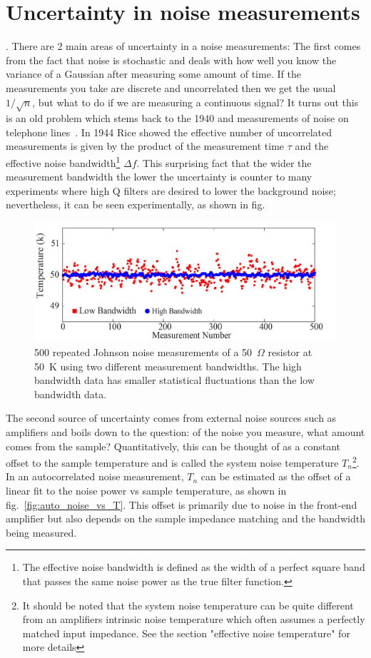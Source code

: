 \section{Uncertainty in noise measurements}
. There are 2 main areas of uncertainty in a noise measurements: The first comes from the fact that noise is stochastic and deals with how well you know the variance of a Gaussian after measuring some amount of time. If the measurements you take are discrete and uncorrelated then we get the usual $1/\sqrt{n}$, but what to do if we are measuring a continuous signal? It turns out this is an old problem which stems back to the 1940 and measurements of noise on telephone lines~\cite{rice}. In 1944 Rice showed the effective number of uncorrelated measurements is given by the product of the measurement time $\tau$ and the effective noise bandwidth\footnote{The effective noise bandwidth is defined as the width of a perfect square band that passes the same noise power as the true filter function.} $\Delta f$. This surprising fact that the wider the measurement bandwidth the lower the uncertainty is counter to many experiments where high Q filters are desired to lower the background noise; nevertheless, it can be seen experimentally, as shown in fig.~\cite{fig:JNT_500measurements}
\begin{figure}
\centering
\includegraphics[width=120mm]{figures/Johnson_noise_thermometry/500_measurements.png}
\caption{500 repeated Johnson noise measurements of a 50~$\Omega$ resistor at 50~K using two different measurement bandwidths. The high bandwidth data has smaller statistical fluctuations than the low bandwidth data.}
\label{fig:JNT_500measurements}
\end{figure}

The second source of uncertainty comes from external noise sources such as amplifiers and boils down to the question: of the noise you measure, what amount comes from the sample? Quantitatively, this can be thought of as a constant offset to the sample temperature and is called the system noise temperature $T_n$\footnote{It should be noted that the system noise temperature can be quite different from an amplifiers intrinsic noise temperature which often assumes a perfectly matched input impedance. See the section "effective noise temperature" for more details}. In an autocorrelated noise measurement, $T_n$ can be estimated as the offset of a linear fit to the noise power vs sample temperature, as shown in fig.~\ref{fig:auto_noise_vs_T}. This offset is primarily due to noise in the front-end amplifier but also depends on the sample impedance matching and the bandwidth being measured.

